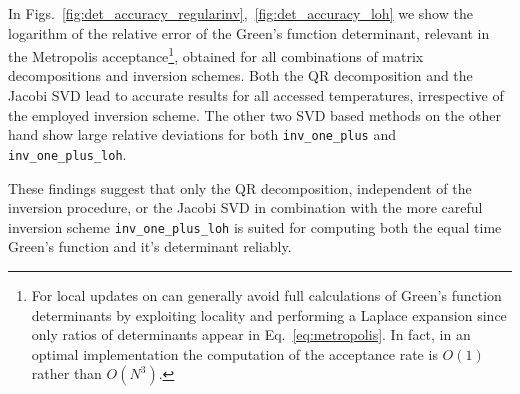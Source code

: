 \documentclass[%
 reprint,
superscriptaddress,
citeautoscript,
showpacs,
 amsmath,amssymb,
 aps,
 prb,
longbibliography,
]{revtex4-2}
\begin{document}
In Figs.~\ref{fig:det_accuracy_regularinv},~\ref{fig:det_accuracy_loh} we show the logarithm of the relative error of the Green's function determinant, relevant in the Metropolis acceptance\footnote{For local updates on can generally avoid full calculations of Green's function determinants by exploiting locality and performing a Laplace expansion since only ratios of determinants appear in Eq.~\ref{eq:metropolis}. In fact, in an optimal implementation the computation of the acceptance rate is $O(1)$ rather than $O(N^3)$.}, obtained for all combinations of matrix decompositions and inversion schemes. Both the QR decomposition and the Jacobi SVD lead to accurate results for all accessed temperatures, irrespective of the employed inversion scheme. The other two SVD based methods on the other hand show large relative deviations for both \texttt{inv\_one\_plus} and \texttt{inv\_one\_plus\_loh}.

These findings suggest that only the QR decomposition, independent of the inversion procedure, or the Jacobi SVD in combination with the more careful inversion scheme \texttt{inv\_one\_plus\_loh} is suited for computing both the equal time Green's function and it's determinant reliably.

%
%
%
%		
%
%
%
\end{document}
